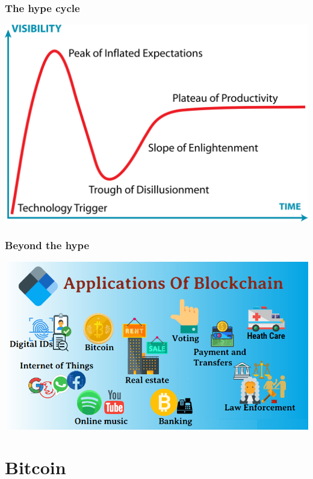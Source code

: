 \documentclass[11pt]{beamer}  %
\begin{document}
\begin{frame}\frametitle{The hype cycle}

  \begin{center}
    \includegraphics[width=\textwidth,clip=false]{pictures/hype-cycle.png}
  \end{center}

\end{frame}

\begin{frame}\frametitle{Beyond the hype}

  \begin{center}
    \includegraphics[scale=0.4,clip=false]{pictures/blockchain-applications.png}
  \end{center}

\end{frame}

\section{Bitcoin}
\end{document}
